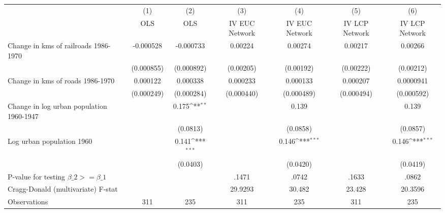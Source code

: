 {
\def\sym#1{\ifmmode^{#1}\else\(^{#1}\)\fi}
\begin{tabular}{l*{6}{c}}
\hline\hline
                &\multicolumn{1}{c}{(1)}&\multicolumn{1}{c}{(2)}&\multicolumn{1}{c}{(3)}&\multicolumn{1}{c}{(4)}&\multicolumn{1}{c}{(5)}&\multicolumn{1}{c}{(6)}\\
                &\multicolumn{1}{c}{OLS}&\multicolumn{1}{c}{OLS}&\multicolumn{1}{c}{IV EUC Network}&\multicolumn{1}{c}{IV EUC Network}&\multicolumn{1}{c}{IV LCP Network}&\multicolumn{1}{c}{IV LCP Network}\\
\hline
Change in kms of railroads 1986-1970&-0.000528         &-0.000733         &  0.00224         &  0.00274         &  0.00217         &  0.00266         \\
                &(0.000855)         &(0.000892)         &(0.00205)         &(0.00192)         &(0.00222)         &(0.00212)         \\
[1em]
Change in kms of roads 1986-1970& 0.000122         & 0.000338         & 0.000233         & 0.000133         & 0.000207         &0.0000941         \\
                &(0.000249)         &(0.000284)         &(0.000440)         &(0.000489)         &(0.000494)         &(0.000592)         \\
[1em]
Change in log urban population 1960-1947&                  &    0.175\sym{**} &                  &    0.139         &                  &    0.139         \\
                &                  & (0.0813)         &                  & (0.0858)         &                  & (0.0857)         \\
[1em]
Log urban population 1960&                  &    0.141\sym{***}&                  &    0.146\sym{***}&                  &    0.146\sym{***}\\
                &                  & (0.0403)         &                  & (0.0420)         &                  & (0.0419)         \\
\hline
P-value for testing $\beta\_{2} >= \beta\_{1}$&                  &                  &    .1471         &    .0742         &    .1633         &    .0862         \\
Cragg-Donald (multivariate) F-stat&                  &                  &  29.9293         &   30.482         &   23.428         &  20.3596         \\
Observations    &      311         &      235         &      311         &      235         &      311         &      235         \\
\hline\hline
\end{tabular}
}
